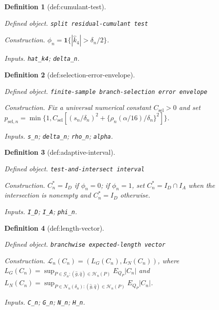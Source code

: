 \documentclass{article}
\newtheorem{definition}{Definition}
\begin{document}
\begin{definition}[def:cumulant-test]\label{def:cumulant-test}
\par\smallskip\noindent\emph{Defined object.} \texttt{split residual-\allowbreak{}cumulant test}
\par\smallskip\noindent\emph{Construction.} \(\phi_n=\mathbf1\{|\widehat k_4|>\delta_n/2\}\).
\par\smallskip\noindent\emph{Inputs.} \texttt{hat\_\allowbreak{}k4}; \texttt{delta\_\allowbreak{}n}.
\end{definition}

\begin{definition}[def:selection-error-envelope]\label{def:selection-error-envelope}
\par\smallskip\noindent\emph{Defined object.} \texttt{finite-\allowbreak{}sample branch-\allowbreak{}selection error envelope}
\par\smallskip\noindent\emph{Construction.} Fix a universal numerical constant \(C_{\mathrm{sel}}>0\) and set \(p_{\mathrm{sel},n}=\min\{1,C_{\mathrm{sel}}[(s_n/\delta_n)^2+\{\rho_n(\alpha/16)/\delta_n\}^2]\}\).
\par\smallskip\noindent\emph{Inputs.} \texttt{s\_\allowbreak{}n}; \texttt{delta\_\allowbreak{}n}; \texttt{rho\_\allowbreak{}n}; \texttt{alpha}.
\end{definition}

\begin{definition}[def:adaptive-interval]\label{def:adaptive-interval}
\par\smallskip\noindent\emph{Defined object.} \texttt{test-\allowbreak{}and-\allowbreak{}intersect interval}
\par\smallskip\noindent\emph{Construction.} \(C_n^*=I_D\) if \(\phi_n=0\); if \(\phi_n=1\), set \(C_n^*=I_D\cap I_A\) when the intersection is nonempty and \(C_n^*=I_D\) otherwise.
\par\smallskip\noindent\emph{Inputs.} \texttt{I\_\allowbreak{}D}; \texttt{I\_\allowbreak{}A}; \texttt{phi\_\allowbreak{}n}.
\end{definition}

\begin{definition}[def:length-vector]\label{def:length-vector}
\par\smallskip\noindent\emph{Defined object.} \texttt{branchwise expected-\allowbreak{}length vector}
\par\smallskip\noindent\emph{Construction.} \(\mathcal L_n(C_n)=(L_G(C_n),L_N(C_n))\), where \(L_G(C_n)=\sup_{P\in\mathcal G_n:(\widehat g,\widehat q)\in\mathcal H_n(P)}E_{Q_P}|C_n|\) and \(L_N(C_n)=\sup_{P\in\mathcal N_n(\delta_n):(\widehat g,\widehat q)\in\mathcal H_n(P)}E_{Q_P}|C_n|\).
\par\smallskip\noindent\emph{Inputs.} \texttt{C\_\allowbreak{}n}; \texttt{G\_\allowbreak{}n}; \texttt{N\_\allowbreak{}n}; \texttt{H\_\allowbreak{}n}.
\end{definition}
\end{document}
